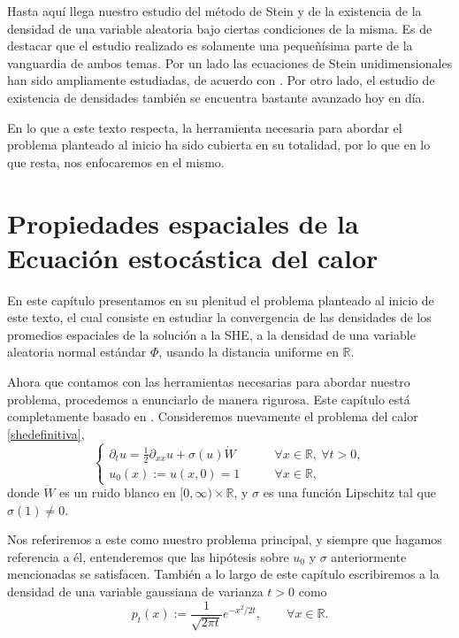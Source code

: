 \documentclass[letterpaper,twoside,12pt]{book}
\newcommand{\R}{\mathbb{R}}
\newcommand{\1}{\mathds{1}}
\theoremstyle{definition}
\theoremstyle{definition}
\theoremstyle{remark}
\theoremstyle{definition}
\theoremstyle{definition}
\theoremstyle{definition}
\theoremstyle{definition}
\theoremstyle{definition}
\begin{document}
Hasta aquí llega nuestro estudio del método de Stein y de la existencia de la densidad de una variable aleatoria bajo ciertas condiciones de la misma. Es de destacar que el estudio realizado es solamente una pequeñísima parte de la vanguardia de ambos temas. Por un lado las ecuaciones de Stein unidimensionales han sido ampliamente estudiadas, de acuerdo con \cite{Nourdin_Peccati_2012}. Por otro lado, el estudio de existencia de densidades también se encuentra bastante avanzado hoy en día.

En lo que a este texto respecta, la herramienta necesaria para abordar el problema planteado al inicio ha sido cubierta en su totalidad, por lo que en lo que resta, nos enfocaremos en el mismo.


\chapter{Propiedades espaciales de la Ecuación estocástica del calor}
En este capítulo presentamos en su plenitud el problema planteado al inicio de este texto, el cual consiste en estudiar la convergencia de las densidades de los promedios espaciales de la solución a la SHE, a la densidad de una variable aleatoria normal estándar $\Phi$, usando la distancia uniforme en $\R$.

Ahora que contamos con las herramientas necesarias para abordar nuestro problema, procedemos a enunciarlo de manera rigurosa. Este capítulo está completamente basado en \cite[pp. 68-71, 75-86.]{KUZGUN202268}. Consideremos nuevamente el problema del calor \eqref{shedefinitiva},
\begin{equation*}
   \begin{cases}
      \partial_t u=\frac{1}{2}\partial_{xx}u+\sigma(u)\dot{W} & \qquad \forall x\in \R, \ \forall t>0,\\
      u_0(x):=u(x,0)=1 & \qquad \forall x\in \R,
   \end{cases}
\end{equation*}
donde $\dot{W}$ es un ruido blanco en $[0,\infty)\times\R$, y $\sigma$ es una función Lipschitz tal que $\sigma(1)\neq 0$.

Nos referiremos a este como nuestro problema principal, y siempre que hagamos referencia a él, entenderemos que las hipótesis sobre $u_0$ y $\sigma$ anteriormente mencionadas se satisfacen. También a lo largo de este capítulo escribiremos a la densidad de una variable gaussiana de varianza $t>0$ como
\[
p_t(x):=\frac{1}{\sqrt{2\pi t}}e^{-x^2/2t}, \qquad \forall x\in \R.
\]
\end{document}

